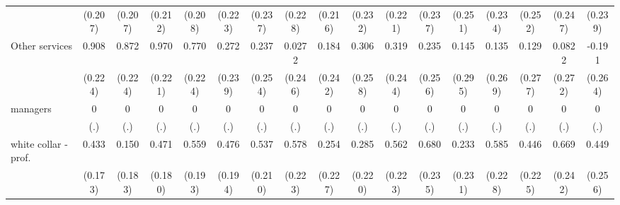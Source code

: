 {\begin{tabular}{l*{16}{c}}
                    &     (0.207)         &     (0.207)         &     (0.212)         &     (0.208)         &     (0.223)         &     (0.237)         &     (0.228)         &     (0.216)         &     (0.232)         &     (0.221)         &     (0.237)         &     (0.251)         &     (0.234)         &     (0.252)         &     (0.247)         &     (0.239)         \\
[1em]
Other services      &       0.908\sym{***}&       0.872\sym{***}&       0.970\sym{***}&       0.770\sym{***}&       0.272         &       0.237         &      0.0272         &       0.184         &       0.306         &       0.319         &       0.235         &       0.145         &       0.135         &       0.129         &      0.0822         &      -0.191         \\
                    &     (0.224)         &     (0.224)         &     (0.221)         &     (0.224)         &     (0.239)         &     (0.254)         &     (0.246)         &     (0.242)         &     (0.258)         &     (0.244)         &     (0.256)         &     (0.295)         &     (0.269)         &     (0.277)         &     (0.272)         &     (0.264)         \\
[1em]
managers            &           0         &           0         &           0         &           0         &           0         &           0         &           0         &           0         &           0         &           0         &           0         &           0         &           0         &           0         &           0         &           0         \\
                    &         (.)         &         (.)         &         (.)         &         (.)         &         (.)         &         (.)         &         (.)         &         (.)         &         (.)         &         (.)         &         (.)         &         (.)         &         (.)         &         (.)         &         (.)         &         (.)         \\
[1em]
white collar - prof.&       0.433\sym{*}  &       0.150         &       0.471\sym{**} &       0.559\sym{**} &       0.476\sym{*}  &       0.537\sym{*}  &       0.578\sym{**} &       0.254         &       0.285         &       0.562\sym{*}  &       0.680\sym{**} &       0.233         &       0.585\sym{*}  &       0.446\sym{*}  &       0.669\sym{**} &       0.449         \\
                    &     (0.173)         &     (0.183)         &     (0.180)         &     (0.193)         &     (0.194)         &     (0.210)         &     (0.223)         &     (0.227)         &     (0.220)         &     (0.223)         &     (0.235)         &     (0.231)         &     (0.228)         &     (0.225)         &     (0.242)         &     (0.256)         \\

\end{tabular}}
